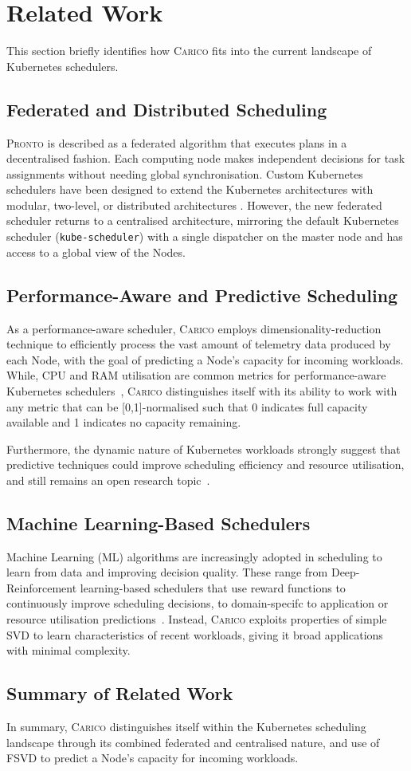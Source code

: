 \section{Related Work}
This section briefly identifies how \textsc{Carico} fits into the current
landscape of Kubernetes schedulers.

\subsection{Federated and Distributed Scheduling}
\textsc{Pronto} is described as a federated algorithm that executes plans in a
decentralised fashion. Each computing node makes independent decisions for task
assignments without needing global synchronisation. Custom Kubernetes schedulers
have been designed to extend the Kubernetes architectures with modular,
two-level, or distributed architectures \cite{beltre2019kubesphere, casquero2019distributed, luong2019multi, zhang2019multi}. However, the new
federated scheduler returns to a centralised architecture, mirroring the default
Kubernetes scheduler (\texttt{kube-scheduler}) with a single dispatcher on the
master node and has access to a global view of the Nodes.

\subsection{Performance-Aware and Predictive Scheduling}
As a performance-aware scheduler, \textsc{Carico} employs
dimensionality-reduction technique to efficiently process the vast amount of
telemetry data produced by each Node, with the goal of predicting a Node's
capacity for incoming workloads. While, CPU and RAM utilisation are common
metrics for performance-aware Kubernetes schedulers~\cite{bao2019deep,
beltre2019kubesphere, bestari2020dynamic, carvalho2021qoe, toka2021ultra},
\textsc{Carico} distinguishes itself with its ability to work with any metric
that can be [0,1]-normalised such that 0 indicates full capacity available and 1
indicates no capacity remaining.

Furthermore, the dynamic nature of Kubernetes workloads strongly suggest that
predictive techniques could improve scheduling efficiency and resource
utilisation, and still remains an open research
topic~\cite{carrion2022kubernetes}.

\subsection{Machine Learning-Based Schedulers}
Machine Learning (ML) algorithms  are increasingly adopted in scheduling to
learn from data and improving decision quality. These range from
Deep-Reinforcement learning-based schedulers \cite{bao2019deep, huang2020rlsk,
peng2021dl2, han2021tailored} that use reward functions to continuously improve
scheduling decisions, to domain-specifc to application or resource utilisation
predictions~\cite{yang2019design, carvalho2021qoe, harichane2020proposal}.
Instead, \textsc{Carico} exploits properties of simple SVD to learn
characteristics of recent workloads, giving it broad applications with minimal
complexity.

\subsection{Summary of Related Work}
In summary, \textsc{Carico} distinguishes itself within the Kubernetes
scheduling landscape through its combined federated and centralised nature, and
use of FSVD to predict a Node's capacity for incoming workloads.
